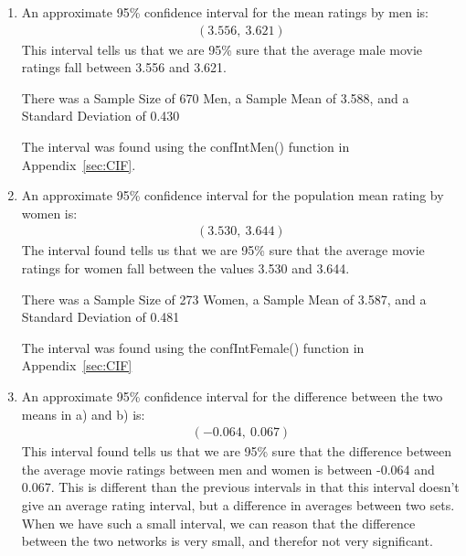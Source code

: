 \documentclass[11pt]{article}  %
\begin{document}
\begin{enumerate}
    \item An approximate 95\% confidence interval for the mean ratings by men is:
    \begin{align*}
        (3.556,\ 3.621) 
    \end{align*}
    This interval tells us that we are 95\% sure that the average male movie ratings fall between 3.556 and 3.621.
    
    There was a Sample Size of 670 Men, a Sample Mean of 3.588, and a Standard Deviation of 0.430
    
    The interval was found using the confIntMen() function in Appendix~\ref{sec:CIF}.
    
    \item An approximate 95\% confidence interval for the population mean rating by women is:
    \begin{align*}
        (3.530,\ 3.644)
    \end{align*}
    The interval found tells us that we are 95\% sure that the average movie ratings for women fall between the values 3.530 and 3.644.
    
    There was a Sample Size of 273 Women, a Sample Mean of 3.587, and a Standard Deviation of 0.481
    
    The interval was found using the confIntFemale() function in Appendix~\ref{sec:CIF} 
    
    \item An approximate 95\% confidence interval for the difference between the two means in a) and b) is:
    \begin{align*}
        (-0.064,\ 0.067)
    \end{align*}
    This interval found tells us that we are 95\% sure that the difference between the average movie ratings between men and women is between -0.064 and 0.067. This is different than the previous intervals in that this interval doesn't give an average rating interval, but a difference in averages between two sets. When we have such a small interval, we can reason that the difference between the two networks is very small, and therefor not very significant. 
    

\end{enumerate}
\end{document}
